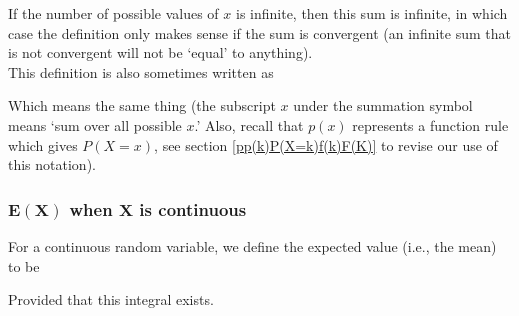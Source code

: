   	\bigskip
	
	\hfil{}
	\bigskip
	
\noindent If the number of possible values of $x$ is infinite, then this sum is infinite, in which case the definition only makes sense if the sum is convergent (an infinite sum that is not convergent will not be `equal' to anything). \\

\noindent This definition is also sometimes written as

  	\bigskip
	
	\hfil{}
	\bigskip

\noindent Which means the same thing (the subscript $x$ under the summation symbol means `sum over all possible $x$.' Also, recall that $p(x)$ represents a function rule which gives $P(X = x)$, see section \ref{pp(k)P(X=k)f(k)F(K)} to revise our use of this notation). \\

\subsubsection{$\boldsymbol{E(X)}$ when $\boldsymbol{X}$ is continuous}
For a continuous random variable, we define the expected value (i.e., the mean) to be

  	\bigskip
	
	\hfil{}
	\bigskip

\noindent Provided that this integral exists.

